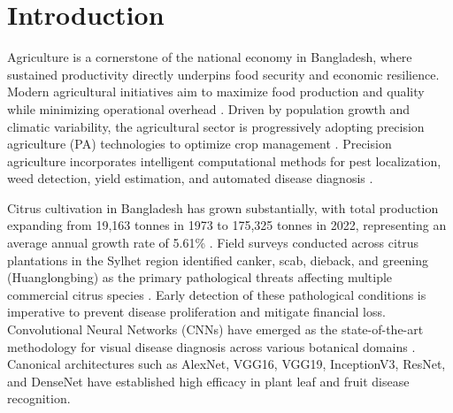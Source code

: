\documentclass{ijcaArticle}
\begin{document}
\begin{abstract} 
Citrus fruit diseases represent a critical threat to global agricultural productivity, causing severe financial and crop yield losses when left undetected or untreated. This study presents a systematic comparative evaluation of transfer learning and deep convolutional neural network (CNN) architectures to classify citrus fruit diseases efficiently and accurately. Using an experimental dataset comprising 1,463 high-resolution images categorized across four distinct classes---canker, black spot, greening, and healthy---four prominent pre-trained architectures (MobileNetV2, InceptionV3, ResNet50, and VGG19) are fine-tuned and benchmarked. The evaluation encompasses both diagnostic performance (accuracy, precision, recall, and F1-score) and computational complexity (training time, inference latency, and memory utilization). Experimental results demonstrate that MobileNetV2 achieves superior diagnostic accuracy of 96.77\% with minimal memory consumption (9.82~MB) and fast inference (83.67~s for the test partition), whereas ResNet50 demonstrates suboptimal generalization on the target dataset with an accuracy of 58.21\%. The findings highlight the critical importance of architectural selection and demonstrate the practical viability of lightweight transfer learning models for automated, edge-deployable citrus disease diagnosis systems.
\end{abstract}

\section{Introduction}

Agriculture is a cornerstone of the national economy in Bangladesh, where sustained productivity directly underpins food security and economic resilience. Modern agricultural initiatives aim to maximize food production and quality while minimizing operational overhead \cite{p1,p2,p19}. Driven by population growth and climatic variability, the agricultural sector is progressively adopting precision agriculture (PA) technologies to optimize crop management \cite{p10,p21}. Precision agriculture incorporates intelligent computational methods for pest localization, weed detection, yield estimation, and automated disease diagnosis \cite{p3}.

Citrus cultivation in Bangladesh has grown substantially, with total production expanding from 19,163 tonnes in 1973 to 175,325 tonnes in 2022, representing an average annual growth rate of 5.61\% \cite{p22}. Field surveys conducted across citrus plantations in the Sylhet region identified canker, scab, dieback, and greening (Huanglongbing) as the primary pathological threats affecting multiple commercial citrus species \cite{p5,p19}. Early detection of these pathological conditions is imperative to prevent disease proliferation and mitigate financial loss. Convolutional Neural Networks (CNNs) have emerged as the state-of-the-art methodology for visual disease diagnosis across various botanical domains \cite{p5}. Canonical architectures such as AlexNet, VGG16, VGG19, InceptionV3, ResNet, and DenseNet have established high efficacy in plant leaf and fruit disease recognition.
\end{document}
